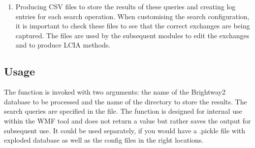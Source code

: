 \documentclass[letterpaper,10pt,english]{sphinxmanual}
\begin{document}
\begin{sphinxVerbatim}[commandchars=\\\{\}]
 
      \PYG{p}{[}
        \PYG{p}{[}\PYG{p}{]}        
    \PYG{p}{]}
 
      \PYG{p}{[}
        \PYG{p}{[}\PYG{p}{]}         
    \PYG{p}{]}
\end{sphinxVerbatim}
\begin{enumerate}
%
\setcounter{enumi}{2}
\item {} 
\sphinxAtStartPar
Producing CSV files to store the results of these queries and creating log entries for each search operation. When customising the search configuration, it is important to check these files to see that the correct exchanges are being captured. The files are used by the subsequent modules to edit the exchanges and to produce LCIA methods.

\end{enumerate}


\subsection{Usage}
\label{\detokenize{SearchWaste:usage}}
\begin{sphinxVerbatim}[commandchars=\\\{\}]
 
\end{sphinxVerbatim}

\sphinxAtStartPar
The  function is invoked with two arguments: the name of the Brightway2 database to be processed and the name of the directory to store the results. The search queries are specified in the  file. The function is designed for internal use within the WMF tool and does not return a value but rather saves the output for subsequent use. It could be used separately, if you would have a .pickle file with exploded database as well as the config files in the right locations.
\end{document}
